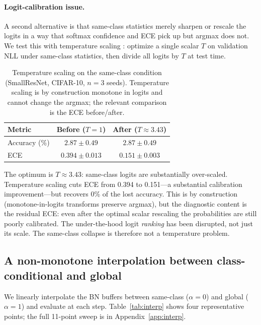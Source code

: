 \documentclass{article}
\begin{document}
\paragraph{Logit-calibration issue.} A second alternative is that same-class statistics merely sharpen or rescale the logits in a way that softmax confidence and ECE pick up but argmax does not. We test this with temperature scaling \citep{guo2017calibration}: optimize a single scalar $T$ on validation NLL under same-class statistics, then divide all logits by $T$ at test time.

\begin{table}[t]
\caption{Temperature scaling on the same-class condition (SmallResNet, CIFAR-10, $n{=}3$ seeds). Temperature scaling is by construction monotone in logits and cannot change the argmax; the relevant comparison is the ECE before/after.}
\label{tab:tempscale}
\centering
\small
\begin{tabular}{@{}lcc@{}}
\toprule
Metric & Before ($T{=}1$) & After ($T \approx 3.43$) \\
\midrule
Accuracy (\%) & $2.87 \pm 0.49$ & $2.87 \pm 0.49$ \\
ECE           & $0.394 \pm 0.013$ & $0.151 \pm 0.003$ \\
\bottomrule
\end{tabular}
\end{table}

The optimum is $T \approx 3.43$: same-class logits are substantially over-scaled. Temperature scaling cuts ECE from 0.394 to 0.151---a substantial calibration improvement---but recovers 0\% of the lost accuracy. This is by construction (monotone-in-logits transforms preserve argmax), but the diagnostic content is the residual ECE: even after the optimal scalar rescaling the probabilities are still poorly calibrated. The under-the-hood logit \emph{ranking} has been disrupted, not just its scale. The same-class collapse is therefore not a temperature problem.

\subsection{A non-monotone interpolation between class-conditional and global}
\label{sec:interp}

We linearly interpolate the BN buffers between same-class ($\alpha=0$) and global ($\alpha=1$) and evaluate at each step. Table~\ref{tab:interp} shows four representative points; the full 11-point sweep is in Appendix~\ref{app:interp}.
\end{document}
